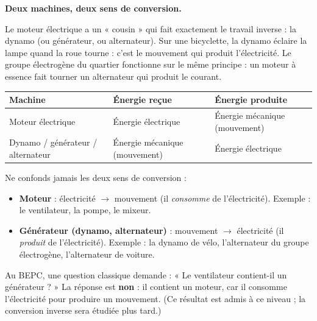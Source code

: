 \documentclass[11pt]{article}
\newcommand{\cle}[1]{{\popxbold\color{popdark}#1}}
\begin{document}
\textbf{Deux machines, deux sens de conversion.}\par

Le moteur électrique a un « cousin » qui fait exactement le travail inverse : la \cle{dynamo} (ou \cle{générateur}, ou \cle{alternateur}). Sur une bicyclette, la dynamo éclaire la lampe quand la roue tourne : c'est le mouvement qui produit l'électricité. Le groupe électrogène du quartier fonctionne sur le même principe : un moteur à essence fait tourner un alternateur qui produit le courant.

\begin{center}
\begin{tabularx}{\linewidth}{|l|X|X|}
\hline
\rowcolor{popblueL} \textbf{Machine} & \textbf{Énergie reçue} & \textbf{Énergie produite} \\
\hline
Moteur électrique & Énergie électrique & Énergie mécanique (mouvement) \\
\hline
Dynamo / générateur / alternateur & Énergie mécanique (mouvement) & Énergie électrique \\
\hline
\end{tabularx}
\end{center}

\begin{attention}
Ne confonds jamais les deux sens de conversion :
\begin{itemize}
\item \textbf{Moteur} : électricité $\rightarrow$ mouvement (il \emph{consomme} de l'électricité). Exemple : le ventilateur, la pompe, le mixeur.
\item \textbf{Générateur (dynamo, alternateur)} : mouvement $\rightarrow$ électricité (il \emph{produit} de l'électricité). Exemple : la dynamo de vélo, l'alternateur du groupe électrogène, l'alternateur de voiture.
\end{itemize}
Au BEPC, une question classique demande : « Le ventilateur contient-il un générateur ? » La réponse est \textbf{non} : il contient un moteur, car il consomme l'électricité pour produire un mouvement. (Ce résultat est admis à ce niveau ; la conversion inverse sera étudiée plus tard.)
\end{attention}
\end{document}
